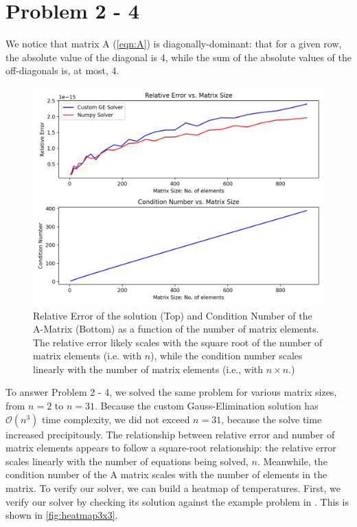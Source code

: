 \documentclass[10pt,letterpaper,notitlepage]{article}
\begin{document}
	\section{Problem 2 - 4}
	We notice that matrix A (\cref{eqn:A}) is diagonally-dominant: that for a given row, the absolute value of the diagonal is 4, while the sum of the absolute values of the off-diagonals is, at most, 4.
	\begin{figure}
		\centering
		\includegraphics[width=0.9\linewidth]{rel_errs}
		\caption[Relative Errors]{Relative Error of the solution (Top) and Condition Number  of the A-Matrix (Bottom) as a function of the number of matrix elements. The relative error likely scales with the square root of the number of matrix elements (i.e. with $n$), while the condition number scales linearly with the number of matrix elements (i.e., with $n \times n$.)}
		\label{fig:relerrs}
	\end{figure}
	To answer Problem 2 - 4, we solved the same problem for various matrix sizes, from $n=2$ to $n=31$. Because the custom Gauss-Elimination solution has $\mathcal{O}(n^3)$ time complexity, we did not exceed $n=31$, because the solve time increased precipitously. The relationship between relative error and number of matrix elements appears to follow a square-root relationship: the relative error scales linearly with the number of equations being solved, $n$.
	Meanwhile, the condition number of the A matrix scales with the number of elements in the matrix.
	To verify our solver, we can build a heatmap of temperatures. First, we verify our solver by checking its solution against the example problem in \cite[p. 871]{chapraNumericalMethodsEngineers2020}. This is shown in \cref{fig:heatmap3x3}.
\end{document}
